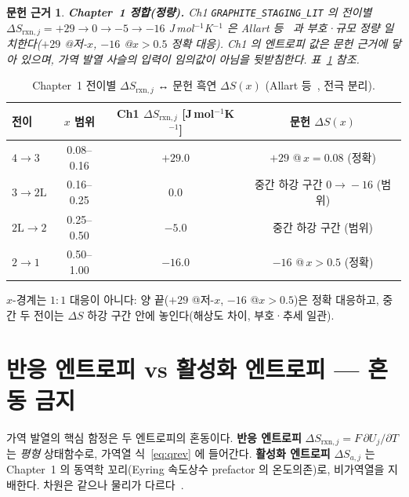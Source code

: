 \documentclass[11pt,a4paper]{article}
\newtheorem*{srcbox}{문헌 근거}
\newcommand{\rxn}{\mathrm{rxn}}
\begin{document}
\begin{srcbox}
\textbf{Chapter~1 정합(정량).} Ch1 \texttt{GRAPHITE\_STAGING\_LIT} 의 전이별
$\Delta S_{\rxn,j}=+29\to0\to-5\to-16$ J\,mol$^{-1}$K$^{-1}$ 은 Allart 등~\cite{allart2018}
과 \emph{부호·규모 정량 일치}한다($+29$ @저-$x$, $-16$ @$x>0.5$ 정확 대응).
Ch1 의 엔트로피 값은 문헌 근거에 닿아 있으며, 가역 발열 사슬의 입력이 임의값이 아님을
뒷받침한다. 표~\ref{tab:ds} 참조.
\end{srcbox}

\begin{table}[h]
\centering\small
\renewcommand{\arraystretch}{1.2}
\caption{Chapter~1 전이별 $\Delta S_{\rxn,j}$ ↔ 문헌 흑연 $\Delta S(x)$ (Allart 등~\cite{allart2018}, 전극 분리).}
\label{tab:ds}
\begin{tabular}{l c c c}
\toprule
전이 & $x$ 범위 & Ch1 $\Delta S_{\rxn,j}$ [J\,mol$^{-1}$K$^{-1}$] & 문헌 $\Delta S(x)$ \\
\midrule
$4\!\to\!3$ & 0.08--0.16 & $+29.0$ & $+29$ @\,$x=0.08$ (정확) \\
$3\!\to\!2\mathrm{L}$ & 0.16--0.25 & $0.0$ & 중간 하강 구간 $0\!\to\!-16$ (범위) \\
$2\mathrm{L}\!\to\!2$ & 0.25--0.50 & $-5.0$ & 중간 하강 구간 (범위) \\
$2\!\to\!1$ & 0.50--1.00 & $-16.0$ & $-16$ @\,$x>0.5$ (정확) \\
\bottomrule
\end{tabular}
\smallskip

{\footnotesize $x$-경계는 $1{:}1$ 대응이 아니다: 양 끝($+29$ @저-$x$, $-16$ @$x>0.5$)은
정확 대응하고, 중간 두 전이는 $\Delta S$ 하강 구간 안에 놓인다(해상도 차이, 부호·추세 일관).}
\end{table}

\section{반응 엔트로피 vs 활성화 엔트로피 — 혼동 금지}\label{sec:caveat}

가역 발열의 핵심 함정은 두 엔트로피의 혼동이다. \textbf{반응 엔트로피}
$\Delta S_{\rxn,j}=F\,\partial U_j/\partial T$ 는 \emph{평형} 상태함수로,
가역열 식~\eqref{eq:qrev} 에 들어간다. \textbf{활성화 엔트로피} $\Delta S_{a,j}$ 는
Chapter~1 의 동역학 꼬리(Eyring 속도상수 prefactor 의 온도의존)로,
비가역열을 지배한다. 차원은 같으나 물리가 다르다~\cite{msmr_partI}.
\end{document}
